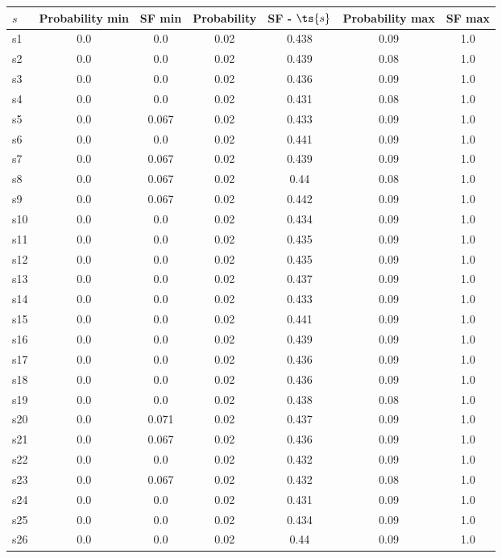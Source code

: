 \documentclass{article}
\begin{document}
\noindent\begin{tabular}{|l|c|c|c|c|c|c|}
\hline
$s$& Probability min & SF min & Probability & SF - $\ts{s}$ & Probability max & SF max\\
\hline
s1 &0.0 & 0.0 & 0.02 & 0.438 & 0.09 & 1.0\\
\hline
s2 &0.0 & 0.0 & 0.02 & 0.439 & 0.08 & 1.0\\
\hline
s3 &0.0 & 0.0 & 0.02 & 0.436 & 0.09 & 1.0\\
\hline
s4 &0.0 & 0.0 & 0.02 & 0.431 & 0.08 & 1.0\\
\hline
s5 &0.0 & 0.067 & 0.02 & 0.433 & 0.09 & 1.0\\
\hline
s6 &0.0 & 0.0 & 0.02 & 0.441 & 0.09 & 1.0\\
\hline
s7 &0.0 & 0.067 & 0.02 & 0.439 & 0.09 & 1.0\\
\hline
s8 &0.0 & 0.067 & 0.02 & 0.44 & 0.08 & 1.0\\
\hline
s9 &0.0 & 0.067 & 0.02 & 0.442 & 0.09 & 1.0\\
\hline
s10 &0.0 & 0.0 & 0.02 & 0.434 & 0.09 & 1.0\\
\hline
s11 &0.0 & 0.0 & 0.02 & 0.435 & 0.09 & 1.0\\
\hline
s12 &0.0 & 0.0 & 0.02 & 0.435 & 0.09 & 1.0\\
\hline
s13 &0.0 & 0.0 & 0.02 & 0.437 & 0.09 & 1.0\\
\hline
s14 &0.0 & 0.0 & 0.02 & 0.433 & 0.09 & 1.0\\
\hline
s15 &0.0 & 0.0 & 0.02 & 0.441 & 0.09 & 1.0\\
\hline
s16 &0.0 & 0.0 & 0.02 & 0.439 & 0.09 & 1.0\\
\hline
s17 &0.0 & 0.0 & 0.02 & 0.436 & 0.09 & 1.0\\
\hline
s18 &0.0 & 0.0 & 0.02 & 0.436 & 0.09 & 1.0\\
\hline
s19 &0.0 & 0.0 & 0.02 & 0.438 & 0.08 & 1.0\\
\hline
s20 &0.0 & 0.071 & 0.02 & 0.437 & 0.09 & 1.0\\
\hline
s21 &0.0 & 0.067 & 0.02 & 0.436 & 0.09 & 1.0\\
\hline
s22 &0.0 & 0.0 & 0.02 & 0.432 & 0.09 & 1.0\\
\hline
s23 &0.0 & 0.067 & 0.02 & 0.432 & 0.08 & 1.0\\
\hline
s24 &0.0 & 0.0 & 0.02 & 0.431 & 0.09 & 1.0\\
\hline
s25 &0.0 & 0.0 & 0.02 & 0.434 & 0.09 & 1.0\\
\hline
s26 &0.0 & 0.0 & 0.02 & 0.44 & 0.09 & 1.0\\

\end{tabular}
\end{document}
